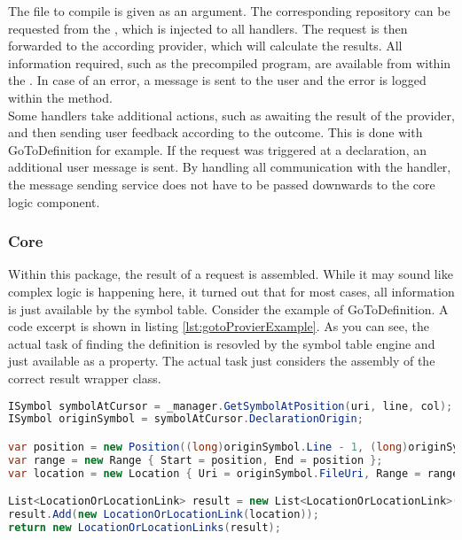 The file to compile is given as an argument.
The corresponding repository can be requested from the , which is injected to all handlers.
The request is then forwarded to the according provider, which will calculate the results.
All information required, such as the precompiled program, are available from within the .
In case of an error, a message is sent to the user and the error is logged within the  method.\\

Some handlers take additional actions, such as awaiting the result of the provider, and then sending user feedback according to the outcome.
This is done with GoToDefinition for example.
If the request was triggered at a declaration, an additional user message is sent.
By handling all communication with the handler, the message sending service does not have to be passed downwards to the core logic component.


\subsubsection{Core}
Within this package, the result of a request is assembled.
While it may sound like complex logic is happening here, it turned out that for most cases, all information is just available by the symbol table.
Consider the example of GoToDefinition.
A code excerpt is shown in listing \ref{lst:gotoProvierExample}.
As you can see, the actual task of finding the definition is resovled by the symbol table engine and just available as a property.
The actual task just considers the assembly of the correct result wrapper class.

\begin{lstlisting}[language=csharp, caption={GoToDefinition, Core Provider}, captionpos=b, label={lst:gotoProvierExample}]
ISymbol symbolAtCursor = _manager.GetSymbolAtPosition(uri, line, col);
ISymbol originSymbol = symbolAtCursor.DeclarationOrigin;

var position = new Position((long)originSymbol.Line - 1, (long)originSymbol.Column - 1);
var range = new Range { Start = position, End = position };
var location = new Location { Uri = originSymbol.FileUri, Range = range };

List<LocationOrLocationLink> result = new List<LocationOrLocationLink>();
result.Add(new LocationOrLocationLink(location));
return new LocationOrLocationLinks(result);
\end{lstlisting}

